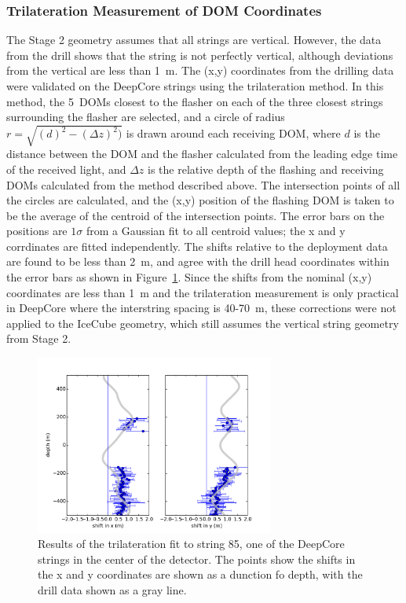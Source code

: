 \subsubsection{Trilateration Measurement of DOM Coordinates}
The Stage 2 geometry assumes that all strings are vertical. However, the data from the drill shows that the string is not perfectly vertical, although deviations from the vertical are less than 1~m. The (x,y) coordinates from the drilling data were validated on the DeepCore strings using the
trilateration method. In this method, the 5~DOMs closest to the
flasher on each of the three closest strings surrounding the flasher are selected,
and a circle of radius $r = \sqrt{(d)^2 - (\Delta z)^2)}$ is drawn
around each receiving DOM, where $d$ is the distance between the DOM and the flasher calculated from the leading edge time of the received
light, and  $\Delta z$ is the relative depth of the flashing and
receiving DOMs calculated from the method described above. The
intersection points of all the circles are calculated, and the (x,y)
position of the flashing DOM is taken to be the average of the
centroid of the intersection points. The error bars on the positions
are $1 \sigma$ from a Gaussian fit to all centroid values; the x and y
corrdinates are fitted independently. The shifts relative to the
deployment data are found to be less than 2~m, and agree with the
drill head coordinates within the error bars as shown in Figure~\ref{fig:trilateration}. Since the shifts from the nominal (x,y) coordinates are less than 1~m and the trilateration measurement is only practical in DeepCore where the interstring spacing is 40-70~m, these corrections were not applied to the IceCube geometry, which still assumes the vertical string geometry from Stage 2.

\begin{figure}[!h]
 \centering
\includegraphics[width=0.7\textwidth]{graphics/geometry/newtrilat85.pdf}
\caption{Results of the trilateration fit to string 85, one of the DeepCore strings in the center of the detector. The points show the shifts in the x and y coordinates are shown as a dunction fo depth, with the drill data shown as a gray line.}
\label{fig:trilateration}
\end{figure}

